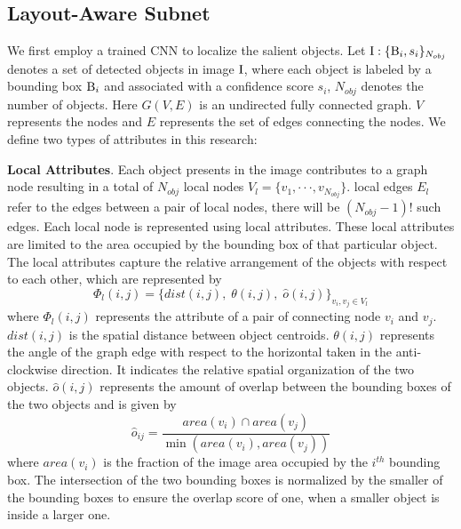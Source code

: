 \documentclass[10pt,twocolumn,letterpaper]{article}
\begin{document}
	\subsection{Layout-Aware Subnet}
	We first employ a trained CNN  \cite{zhang:2015:CVPR:boundingbox} to localize the salient objects. Let ${\rm I}:{\{ {{\rm B}_i},{s_i}\} _{{N_{obj}}}}$ denotes a set of detected objects in image ${\rm I}$, where each object is labeled by a bounding box ${{\rm B}_i}$ and associated with a confidence score ${s_i}$, $N_{obj}$ denotes the number of objects.
	Here $G(V,E)$ is an undirected fully connected graph. 
	$V$ represents the nodes and $E$ represents the set of edges connecting the nodes. We define two types of attributes in this research:
	
	\textbf{Local Attributes}. Each object presents in the image contributes to a graph node resulting in a total of $N_{obj}$ local nodes ${V_{l}} = \{ {v_1}, \cdot  \cdot  \cdot ,{v_{{N_{obj}}}}\} $. local edges $E_{l}$ refer to the edges between a pair of local nodes, there will be $({N_{obj}} - 1)!$ such edges. Each local node is represented using local attributes. These local attributes are limited to the area occupied by the bounding box of that particular object. The local attributes capture the relative arrangement of the objects with respect to each other, which are represented by 
	\begin{equation}
	{\Phi _{l}}(i,j) = {\{ dist(i,j),\;\theta (i,j),\;\hat o(i,j)\} _{{v_i},{v_j} \in {V_{l}}}}
	\end{equation}
	where ${\Phi _{l}}(i,j)$ represents the attribute of a pair of connecting node $v_i$ and $v_j$. $dist(i,j)$ is the spatial distance between object centroids. $\theta(i,j)$ represents the angle of the graph edge with respect to the horizontal taken in the anti-clockwise direction. It indicates the relative spatial organization of the two objects. $\hat o(i,j)$ represents the amount of overlap between the bounding boxes of the two objects and is given by 
	\vspace{-3mm}
	\begin{equation}
	{\hat o_{ij}} = \frac{{area({v_i}) \cap area({v_j})}}{{\min (area({v_i}),area({v_j}))}}
	\end{equation}
	where ${area({v_i})}$ is the fraction of the image area occupied by the ${i^{th}}$ bounding box. The intersection of the two bounding boxes is normalized by the smaller of the bounding boxes to ensure the overlap score of one, when a smaller object is inside a larger one.
	
\end{document}
